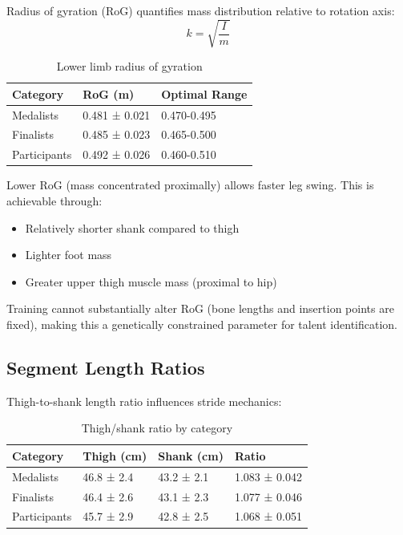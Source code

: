 Radius of gyration (RoG) quantifies mass distribution relative to rotation axis:
\begin{equation}
k = \sqrt{\frac{I}{m}}
\end{equation}

\begin{table}[H]
\centering
\caption{Lower limb radius of gyration}
\begin{tabular}{@{}lll@{}}
\toprule
\textbf{Category} & \textbf{RoG (m)} & \textbf{Optimal Range} \\
\midrule
Medalists & 0.481 ± 0.021 & 0.470-0.495 \\
Finalists & 0.485 ± 0.023 & 0.465-0.500 \\
Participants & 0.492 ± 0.026 & 0.460-0.510 \\
\bottomrule
\end{tabular}
\end{table}

Lower RoG (mass concentrated proximally) allows faster leg swing. This is achievable through:
\begin{itemize}
    \item Relatively shorter shank compared to thigh
    \item Lighter foot mass
    \item Greater upper thigh muscle mass (proximal to hip)
\end{itemize}

Training cannot substantially alter RoG (bone lengths and insertion points are fixed), making this a genetically constrained parameter for talent identification.

\subsection{Segment Length Ratios}

Thigh-to-shank length ratio influences stride mechanics:

\begin{table}[H]
\centering
\caption{Thigh/shank ratio by category}
\begin{tabular}{@{}llll@{}}
\toprule
\textbf{Category} & \textbf{Thigh (cm)} & \textbf{Shank (cm)} & \textbf{Ratio} \\
\midrule
Medalists & 46.8 ± 2.4 & 43.2 ± 2.1 & 1.083 ± 0.042 \\
Finalists & 46.4 ± 2.6 & 43.1 ± 2.3 & 1.077 ± 0.046 \\
Participants & 45.7 ± 2.9 & 42.8 ± 2.5 & 1.068 ± 0.051 \\
\bottomrule
\end{tabular}
\end{table}

